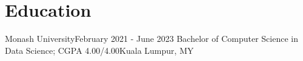 \section{Education}
  \resumeSubHeadingListStart
    \resumeSubheading
      {Monash University}{February 2021 - June 2023}
      {Bachelor of Computer Science in Data Science; CGPA 4.00/4.00}{Kuala Lumpur, MY}
    \resumeItemListStart
    \resumeItemListEnd
  \resumeSubHeadingListEnd
